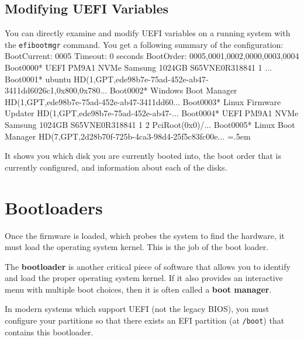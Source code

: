 \documentclass{article}
\newenvironment{cverbatim}
    {\SaveVerbatim{cverb}}
    {\endSaveVerbatim
    \flushleft\fboxrule=0pt\fboxsep=.5em
    \colorbox{cverbbg}{%
      \makebox[\dimexpr\linewidth-2\fboxsep][l]{\BUseVerbatim{cverb}}%
    }
    \endflushleft
  }
\begin{document}
  \subsection{Modifying UEFI Variables}

    You can directly examine and modify UEFI variables on a running system with the \texttt{efibootmgr} command. You get a following summary of the configuration: 
    \begin{cverbatim}
      BootCurrent: 0005
      Timeout: 0 seconds
      BootOrder: 0005,0001,0002,0000,0003,0004
      Boot0000* UEFI PM9A1 NVMe Samsung 1024GB S65VNE0R318841 1	...
      Boot0001* ubuntu	HD(1,GPT,ede98b7e-75ad-452e-ab47-3411dd6026c1,0x800,0x780...
      Boot0002* Windows Boot Manager	HD(1,GPT,ede98b7e-75ad-452e-ab47-3411dd60...
      Boot0003* Linux Firmware Updater	HD(1,GPT,ede98b7e-75ad-452e-ab47-...
      Boot0004* UEFI PM9A1 NVMe Samsung 1024GB S65VNE0R318841 1 2	PciRoot(0x0)/...
      Boot0005* Linux Boot Manager	HD(7,GPT,2d28b70f-725b-4ca3-98d4-25f5c83fc00e...
    \end{cverbatim}

  It shows you which disk you are currently booted into, the boot order that is currently configured, and information about each of the disks. 

\section{Bootloaders} 

  Once the firmware is loaded, which probes the system to find the hardware, it must load the operating system kernel. This is the job of the boot loader.

  \begin{definition}
    The \textbf{bootloader} is another critical piece of software that allows you to identify and load the proper operating system kernel. If it also provides an interactive menu with multiple boot choices, then it is often called a \textbf{boot manager}. 
  \end{definition}

  In modern systems which support UEFI (not the legacy BIOS), you must configure your partitions so that there exists an EFI partition (at \texttt{/boot}) that contains this bootloader. 
\end{document}
